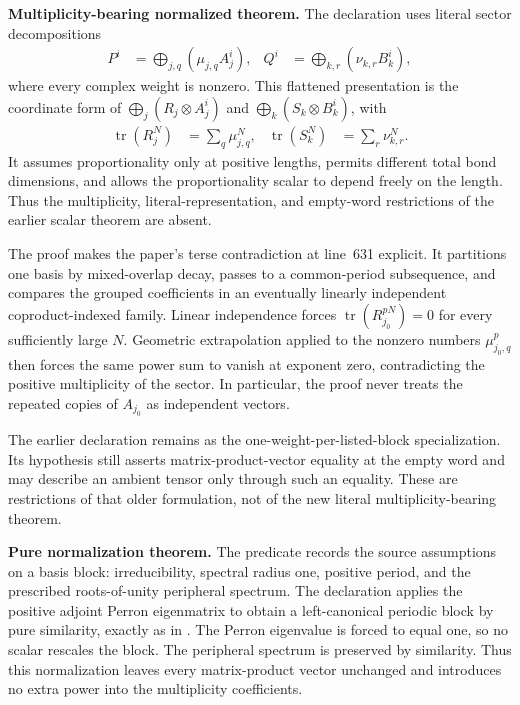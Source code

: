 \documentclass{article}
\begin{document}
\textbf{Multiplicity-bearing normalized theorem.} The declaration
 uses literal sector
decompositions
\begin{align}
  P^i&=\bigoplus_{j,q}(\mu_{j,q}A_j^i),&
  Q^i&=\bigoplus_{k,r}(\nu_{k,r}B_k^i),
\end{align}
where every complex weight is nonzero.  This flattened presentation is the
coordinate form of $\bigoplus_j(R_j\otimes A_j^i)$ and
$\bigoplus_k(S_k\otimes B_k^i)$, with
\begin{align}
  \operatorname{tr}(R_j^N)&=\sum_q\mu_{j,q}^N,&
  \operatorname{tr}(S_k^N)&=\sum_r\nu_{k,r}^N.
\end{align}
It assumes proportionality only at positive lengths, permits different total
bond dimensions, and allows the proportionality scalar to depend freely on
the length.  Thus the multiplicity, literal-representation, and empty-word
restrictions of the earlier scalar theorem are absent.

The proof makes the paper's terse contradiction at line~631 explicit.  It
partitions one basis by mixed-overlap decay, passes to a common-period
subsequence, and compares the grouped coefficients in an eventually linearly
independent coproduct-indexed family.  Linear independence forces
$\operatorname{tr}(R_{j_0}^{pN})=0$ for every sufficiently large $N$.
Geometric extrapolation applied to the nonzero numbers $\mu_{j_0,q}^p$ then
forces the same power sum to vanish at exponent zero, contradicting the
positive multiplicity of the sector.  In particular, the proof never treats
the repeated copies of $A_{j_0}$ as independent vectors.

The earlier declaration
 remains as the
one-weight-per-listed-block specialization.  Its hypothesis still asserts
matrix-product-vector equality at the empty word and may describe an ambient
tensor only through such an equality.  These are restrictions of that older
formulation, not of the new literal multiplicity-bearing theorem.

\textbf{Pure normalization theorem.} The predicate
 records the source assumptions on a basis block:
irreducibility, spectral radius one, positive period, and the prescribed
roots-of-unity peripheral spectrum.  The declaration
 applies the positive
adjoint Perron eigenmatrix to obtain a left-canonical periodic block by pure
similarity, exactly as in
\cite[lines~313--332]{DeLasCuevas2017Irreducible}.  The Perron eigenvalue is
forced to equal one, so no scalar rescales the block.  The peripheral spectrum
is preserved by similarity.  Thus this normalization leaves every
matrix-product vector unchanged and introduces no extra power into the
multiplicity coefficients.
\end{document}
